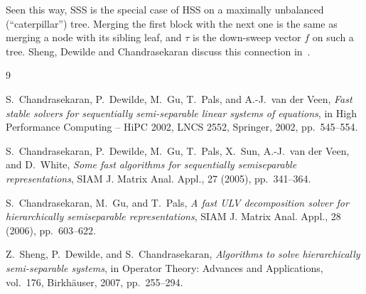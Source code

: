 \documentclass[11pt]{article}
\theoremstyle{definition}
\begin{document}
Seen this way, SSS is the special case of HSS on a maximally unbalanced
(``caterpillar'') tree. Merging the first block with the next one is the same
as merging a node with its sibling leaf, and $\tau$ is the down-sweep
vector $f$ on such a tree. Sheng, Dewilde and Chandrasekaran discuss this
connection in~\cite{SDC07}.

\begin{thebibliography}{9}

S.~Chandrasekaran, P.~Dewilde, M.~Gu, T.~Pals, and A.-J.~van der Veen,
\emph{Fast stable solvers for sequentially semi-separable linear systems of equations},
in High Performance Computing -- HiPC 2002, LNCS 2552, Springer, 2002, pp.~545--554.

S.~Chandrasekaran, P.~Dewilde, M.~Gu, T.~Pals, X.~Sun, A.-J.~van der Veen, and D.~White,
\emph{Some fast algorithms for sequentially semiseparable representations},
SIAM J. Matrix Anal. Appl., 27 (2005), pp.~341--364.

S.~Chandrasekaran, M.~Gu, and T.~Pals,
\emph{A fast ULV decomposition solver for hierarchically semiseparable representations},
SIAM J. Matrix Anal. Appl., 28 (2006), pp.~603--622.

Z.~Sheng, P.~Dewilde, and S.~Chandrasekaran,
\emph{Algorithms to solve hierarchically semi-separable systems},
in Operator Theory: Advances and Applications, vol.~176, Birkh\"auser, 2007, pp.~255--294.

\end{thebibliography}
\end{document}
